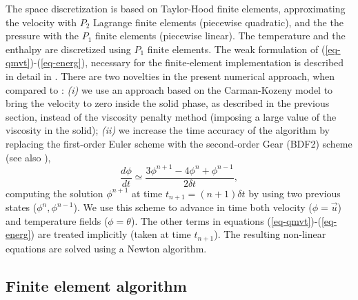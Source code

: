 The space discretization is based on Taylor-Hood finite elements, approximating  the velocity with $P_{2}$ Lagrange finite elements (piecewise quadratic), and the
the pressure with the $P_{1}$ finite elements (piecewise linear). The temperature and the enthalpy are discretized using $P_1$ finite elements.  
The weak formulation of (\ref{eq-qmvt})-(\ref{eq-energ}), necessary for the finite-element implementation is described in detail in \cite{dan-2014-JCP}.  There are two novelties in the present numerical approach, when compared to  \cite{dan-2014-JCP}: 
{\em (i)} we use an approach based on the Carman-Kozeny model to bring the velocity to zero inside the solid phase, as described in the previous section, instead of the  viscosity penalty method (imposing a large value of the viscosity in the solid);
{\em (ii)} we increase  the time accuracy of the algorithm by replacing the first-order Euler scheme with the second-order Gear (BDF2) scheme (see also \cite{Belhamadia2012}),
\begin{equation}	
\label{eq-Gear}
	\frac{d\phi}{dt} \simeq \frac{3\phi^{n+1} - 4\phi^{n}+ \phi^{n-1}}{2\delta t},
\end{equation}
computing the solution $\phi^{n+1}$ at time  $t_{n+1}=(n+1) \delta t$ by using two previous states ($\phi^{n}, \phi^{n-1}$). We use this scheme to advance in time both velocity ($\phi=\vec{u}$) and temperature fields  ($\phi=\theta$).  The other terms in equations (\ref{eq-qmvt})-(\ref{eq-energ}) are treated implicitly (\ie taken at time $t_{n+1}$). The resulting non-linear equations are solved using a Newton algorithm. 

\subsection{Finite element algorithm} \label{sec-FE-algo}

